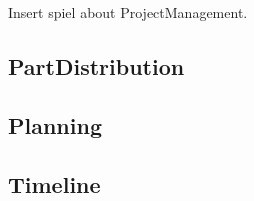 

Insert spiel about ProjectManagement.

\subsection{PartDistribution}


\subsection{Planning}


\subsection{Timeline}

